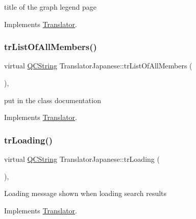 title of the graph legend page 

Implements \mbox{\hyperlink{class_translator}{Translator}}.

\mbox{\label{class_translator_japanese_a98a6bb8e80def1a098f1a1e40bd00c0c}} 
\subsubsection{\texorpdfstring{trListOfAllMembers()}{trListOfAllMembers()}}
{\footnotesize\ttfamily virtual \mbox{\hyperlink{class_q_c_string}{Q\+C\+String}} Translator\+Japanese\+::tr\+List\+Of\+All\+Members (\begin{DoxyParamCaption}{ }\end{DoxyParamCaption})\hspace{0.3cm}{\ttfamily [inline]}, {\ttfamily [virtual]}}

put in the class documentation 

Implements \mbox{\hyperlink{class_translator}{Translator}}.

\mbox{\label{class_translator_japanese_a25ecacc49af6381bb740bb9e2a68c42c}} 
\subsubsection{\texorpdfstring{trLoading()}{trLoading()}}
{\footnotesize\ttfamily virtual \mbox{\hyperlink{class_q_c_string}{Q\+C\+String}} Translator\+Japanese\+::tr\+Loading (\begin{DoxyParamCaption}{ }\end{DoxyParamCaption})\hspace{0.3cm}{\ttfamily [inline]}, {\ttfamily [virtual]}}

Loading message shown when loading search results 

Implements \mbox{\hyperlink{class_translator}{Translator}}.

\mbox{\label{class_translator_japanese_a25159d29b4c967bf3e9d2de18ba43243}} 
